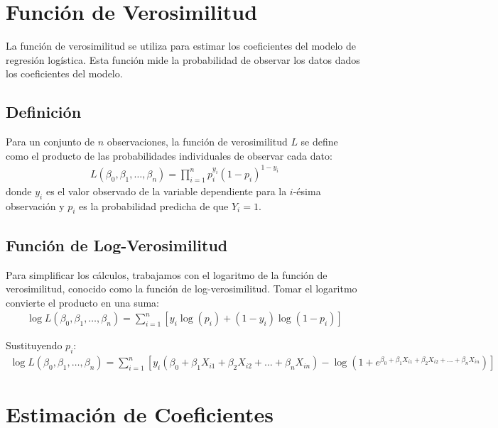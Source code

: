 \section{Funci\'on de Verosimilitud}

La funci\'on de verosimilitud se utiliza para estimar los coeficientes del modelo de regresi\'on log\'istica. Esta funci\'on mide la probabilidad de observar los datos dados los coeficientes del modelo.

\subsection{Definici\'on}

Para un conjunto de $n$ observaciones, la funci\'on de verosimilitud $L$ se define como el producto de las probabilidades individuales de observar cada dato:
\begin{eqnarray*}
L(\beta_0, \beta_1, \ldots, \beta_n) = \prod_{i=1}^{n} p_i^{y_i} (1 - p_i)^{1 - y_i}
\end{eqnarray*}
donde $y_i$ es el valor observado de la variable dependiente para la $i$-\'esima observaci\'on y $p_i$ es la probabilidad predicha de que $Y_i = 1$.

\subsection{Funci\'on de Log-Verosimilitud}

Para simplificar los c\'alculos, trabajamos con el logaritmo de la funci\'on de verosimilitud, conocido como la funci\'on de log-verosimilitud. Tomar el logaritmo convierte el producto en una suma:
\begin{eqnarray*}
\log L(\beta_0, \beta_1, \ldots, \beta_n) = \sum_{i=1}^{n} \left[ y_i \log(p_i) + (1 - y_i) \log(1 - p_i) \right]
\end{eqnarray*}

Sustituyendo $p_i$:
\begin{eqnarray*}
\log L(\beta_0, \beta_1, \ldots, \beta_n) = \sum_{i=1}^{n} \left[ y_i (\beta_0 + \beta_1 X_{i1} + \beta_2 X_{i2} + \ldots + \beta_n X_{in}) - \log(1 + e^{\beta_0 + \beta_1 X_{i1} + \beta_2 X_{i2} + \ldots + \beta_n X_{in}}) \right]
\end{eqnarray*}

\section{Estimaci\'on de Coeficientes}

